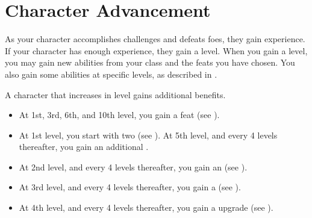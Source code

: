 \section{Character Advancement}\label{Character Advancement}

    As your character accomplishes challenges and defeats foes, they gain experience.
    If your character has enough experience, they gain a level.
    When you gain a level, you may gain new abilities from your class and the feats you have chosen.
    You also gain some abilities at specific levels, as described in .

    A character that increases in level gains additional benefits.
    \begin{itemize}
        \item At 1st, 3rd, 6th, and 10th level, you gain a feat (see ).
        \item At 1st level, you start with two  (see ). At 5th level, and every 4 levels thereafter, you gain an additional .
        \item At 2nd level, and every 4 levels thereafter, you gain an  (see ).
        \item At 3rd level, and every 4 levels thereafter, you gain a  (see ).
        \item At 4th level, and every 4 levels thereafter, you gain a  upgrade (see ).
    \end{itemize}

